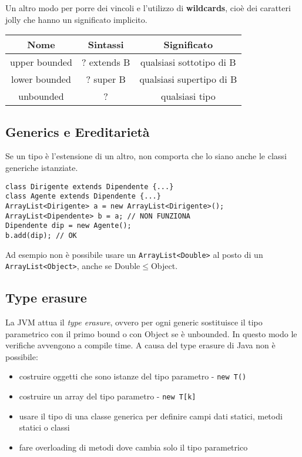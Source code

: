 Un altro modo per porre dei vincoli e l'utilizzo di \textbf{wildcards}, cioè dei caratteri jolly che hanno un significato implicito.

\begin{table}[H]
\centering
\begin{tabular}{|c|c|c|}
\hline
\textbf{Nome} & \textbf{Sintassi} & \textbf{Significato} \\
\hline
upper bounded & ? extends B & qualsiasi sottotipo di B \\
\hline
lower bounded & ? super B & qualsiasi supertipo di B \\
\hline
unbounded & ? & qualsiasi tipo \\
\hline
\end{tabular}
\end{table}

\subsection{Generics e Ereditarietà}
Se un tipo è l'estensione di un altro, non comporta che lo siano anche le classi generiche istanziate. 
\begin{lstlisting}
class Dirigente extends Dipendente {...}
class Agente extends Dipendente {...}
ArrayList<Dirigente> a = new ArrayList<Dirigente>();
ArrayList<Dipendente> b = a; // NON FUNZIONA
Dipendente dip = new Agente();
b.add(dip); // OK
\end{lstlisting}
Ad esempio non è possibile usare un \texttt{ArrayList<Double>} al posto di un \texttt{ArrayList<Object>}, anche se Double$\le$Object.

\subsection{Type erasure}
La JVM attua il \textit{type erasure}, ovvero per ogni generic sostituisce il tipo parametrico con il primo bound o con Object se è unbounded. In questo modo le verifiche avvengono a compile time. A causa del type erasure di Java non è possibile:
\begin{itemize}
\item costruire oggetti che sono istanze del tipo parametro - \texttt{new T()}
\item costruire un array del tipo parametro - \texttt{new T[k]}
\item usare il tipo di una classe generica per definire campi dati statici, metodi statici o classi
\item fare overloading di metodi dove cambia solo il tipo parametrico
\end{itemize}

